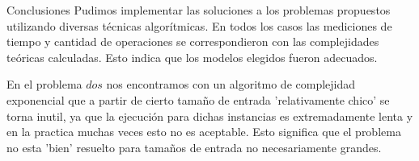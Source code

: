 \documentclass[12pt,titlepage]{article}
\begin{document}
	\begin{section}{Conclusiones}
		Pudimos implementar las soluciones a los problemas propuestos utilizando diversas técnicas algorítmicas. En todos los casos las mediciones de tiempo y cantidad de operaciones se correspondieron con las complejidades teóricas calculadas. Esto indica que los modelos elegidos fueron adecuados.

		En el problema $dos$ nos encontramos con un algoritmo de complejidad exponencial que a partir de cierto tamaño de entrada 'relativamente chico' se torna inutil, ya que la ejecución para dichas instancias es extremadamente lenta y en la practica muchas veces esto no es aceptable. Esto significa que el problema no esta 'bien' resuelto para tamaños de entrada no necesariamente grandes.
	\end{section}
\end{document}
